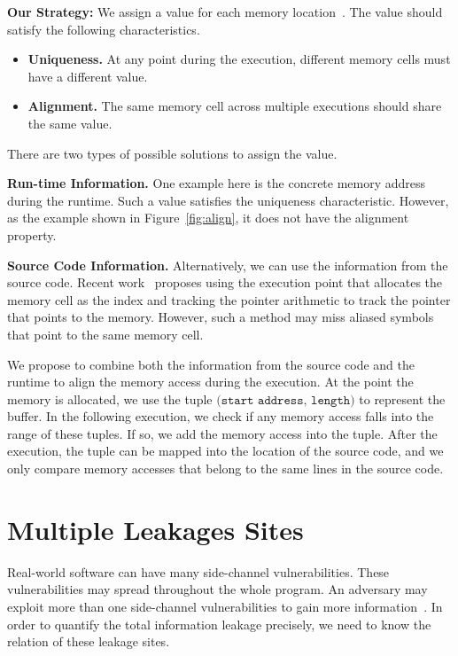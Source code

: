 \textbf{Our Strategy: } We assign a value for each memory location~\cite{sumner2010memory}. The value should satisfy the following characteristics.
\begin{itemize}
  \item \textbf{Uniqueness.} At any point during the execution, different memory cells must have a different value.
  \item \textbf{Alignment.} The same memory cell across multiple executions should share the same value.
\end{itemize}

There are two types of possible solutions to assign the value.

\textbf{Run-time Information.} One example here is the concrete memory address during the runtime. Such a value satisfies the uniqueness characteristic. However, as the example shown in Figure~\ref{fig:align}, it does not have the alignment property.

\textbf{Source Code Information.} Alternatively, we can use the information from the source code. Recent work~\cite{sumner2010memory} proposes using the execution point that allocates the memory cell as the index and tracking the pointer arithmetic to track the pointer that points to the memory. However, such a method may miss aliased symbols that point to the same memory cell.

We propose to combine both the information from the source code and the runtime to align the memory access during the execution. At the point the memory is allocated, we use the tuple $\texttt{(start\ address, length)}$ to represent the buffer. In the following execution, we check if any memory access falls into the range of these tuples. If so, we add the memory access into the tuple. After the execution, the tuple can be mapped into the location of the source code, and we only compare memory accesses that belong to the same lines in the source code.

\section{Multiple Leakages Sites}
Real-world software can have many side-channel vulnerabilities. These vulnerabilities may spread throughout the whole program. An adversary may exploit more than one side-channel vulnerabilities to gain more information~\cite{7163052, 191010}. In order to quantify the
total information leakage precisely, we need to know the relation of these leakage sites. 

